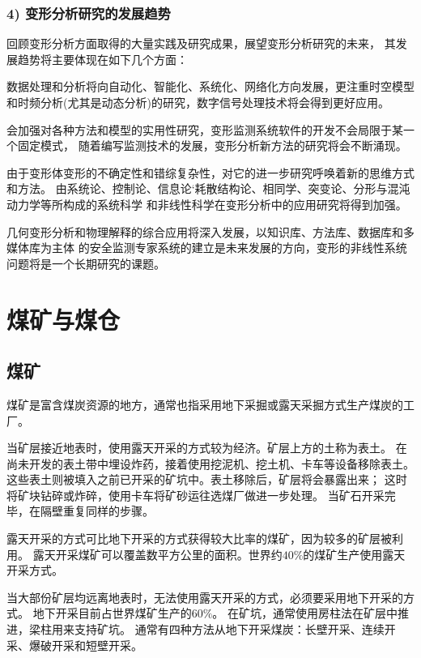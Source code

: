 \subsubsection*{4) 变形分析研究的发展趋势}
回顾变形分析方面取得的大量实践及研究成果，展望变形分析研究的未来，
其发展趋势将主要体现在如下几个方面：
\begin{asparaitem}[$\bullet$]
\item 数据处理和分析将向自动化、智能化、系统化、网络化方向发展，更注重时空模型
和时频分析(尤其是动态分析)的研究，数字信号处理技术将会得到更好应用。
\item 会加强对各种方法和模型的实用性研究，变形监测系统软件的开发不会局限于某一个固定模式，
随着编写监测技术的发展，变形分析新方法的研究将会不断涌现。
\item 由于变形体变形的不确定性和错综复杂性，对它的进一步研究呼唤着新的思维方式和方法。
由系统论、控制论、信息论‘耗散结构论、相同学、突变论、分形与混沌动力学等所构成的系统科学
和非线性科学在变形分析中的应用研究将得到加强。
\item 几何变形分析和物理解释的综合应用将深入发展，以知识库、方法库、数据库和多媒体库为主体
的安全监测专家系统的建立是未来发展的方向，变形的非线性系统问题将是一个长期研究的课题。
\end{asparaitem}


\section{煤矿与煤仓}
\subsection{煤矿}
煤矿是富含煤炭资源的地方，通常也指采用地下采掘或露天采掘方式生产煤炭的工厂。

当矿层接近地表时，使用露天开采的方式较为经济。矿层上方的土称为表土。
在尚未开发的表土带中埋设炸药，接着使用挖泥机、挖土机、卡车等设备移除表土。
这些表土则被填入之前已开采的矿坑中。表土移除后，矿层将会暴露出来；
这时将矿块钻碎或炸碎，使用卡车将矿砂运往选煤厂做进一步处理。
当矿石开采完毕，在隔壁重复同样的步骤。

露天开采的方式可比地下开采的方式获得较大比率的煤矿，因为较多的矿层被利用。
露天开采煤矿可以覆盖数平方公里的面积。世界约$40\%$的煤矿生产使用露天开采方式。

当大部份矿层均远离地表时，无法使用露天开采的方式，必须要采用地下开采的方式。
地下开采目前占世界煤矿生产的$60\%$。
在矿坑，通常使用房柱法在矿层中推进，梁柱用来支持矿坑。
通常有四种方法从地下开采煤炭：长壁开采、连续开采、爆破开采和短壁开采。

